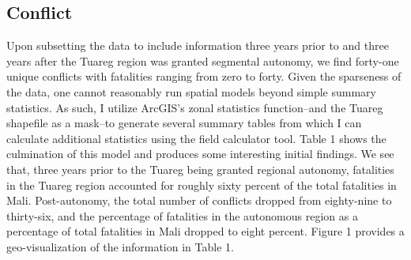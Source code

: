 \documentclass[12pt]{elsarticle}
\begin{document}
\subsection{Conflict}
Upon subsetting the data to include information three years prior to and three years after the Tuareg region was granted segmental autonomy, we find forty-one unique conflicts with fatalities ranging from zero to forty. Given the sparseness of the data, one cannot reasonably run spatial models beyond simple summary statistics. As such, I utilize ArcGIS's zonal statistics function--and the Tuareg shapefile as a mask--to generate several summary tables from which I can calculate additional statistics using the field calculator tool. Table 1 shows the culmination of this model and produces some interesting initial findings. We see that, three years prior to the Tuareg being granted regional autonomy, fatalities in the Tuareg region accounted for roughly sixty percent of the total fatalities in Mali. Post-autonomy, the total number of conflicts dropped from eighty-nine to thirty-six, and the percentage of fatalities in the autonomous region as a percentage of total fatalities in Mali dropped to eight percent. Figure 1 provides a geo-visualization of the information in Table 1.

\begin{table}
    \tiny
\begin{center}
\caption{Fatalities in Mali (1997 - 2003)}
\end{center}
\end{table}
\end{document}
